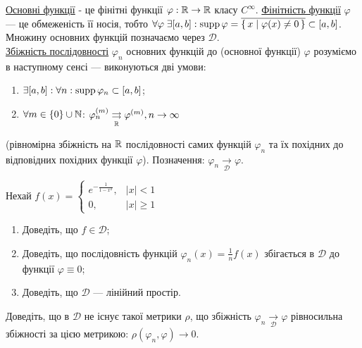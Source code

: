 
\begin{theory}
    \ul{Основні функції} - це фінітні функції $\varphi: \mathbb{R} \to \mathbb{R}$ класу $C^\infty$.
    \ul{Фінітність функції} $\varphi$ --- це обмеженість її носія, тобто $\forall\varphi\;\exists[a,b]:
    \operatorname{supp} \varphi = \overline{\set{x \mid \varphi(x)\neq 0}} \subset [a,b]$. Множину основних
    функцій позначаємо через $\mathcal{D}$.\\
    \ul{Збіжність послідовності} $\varphi_n$ основних функцій до (основної функції) $\varphi$
    розуміємо в наступному сенсі --- виконуються дві умови:
    \begin{enumerate}
        \item $\exists [a,b]: \forall n: \operatorname{supp}\varphi_n \subset [a,b]$;
        \item $\forall m \in \{0\} \cup \mathbb{N}$:
        $\varphi_n^{(m)} \underset{\mathbb{R}}{\rightrightarrows} \varphi^{(m)}, n\to\infty$
    \end{enumerate}
    (рівномірна збіжність на $\mathbb{R}$ послідовності самих функцій $\varphi_n$ та їх похідних
    до відповідних похідних функції $\varphi$). Позначення: $\varphi_n \underset{\mathcal{D}}{\to} \varphi$.
\end{theory}

\begin{exercise}
    Нехай $f(x) = \begin{cases}
        e^{-\frac{1}{1-x^2}}, & |x| < 1 \\
        0, & |x| \geq 1
    \end{cases}$
    \begin{enumerate}
        \item Доведіть, що $f \in \mathcal{D}$;
        \item Доведіть, що послідовність функцій $\varphi_n(x)=\frac{1}{n}f(x)$ збігається
              в $\mathcal{D}$ до функції $\varphi \equiv 0$;
        \item Доведіть, що $\mathcal{D}$ --- лінійний простір.
    \end{enumerate}
\end{exercise}

\begin{exercise}
    Доведіть, що в $\mathcal{D}$ не існує такої метрики $\rho$, що збіжність
    $\varphi_n \underset{\mathcal{D}}{\to} \varphi$ рівносильна збіжності за цією метрикою:
    $\rho(\varphi_n,\varphi) \to 0$.
\end{exercise}


